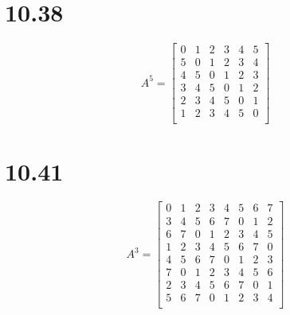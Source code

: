 \documentclass{article}
\begin{document}
\section*{10.38}
$$A^5 = \begin{bmatrix}
0 & 1 & 2 & 3 & 4 & 5 \\
5 & 0 & 1 & 2 & 3 & 4 \\
4 & 5 & 0 & 1 & 2 & 3 \\
3 & 4 & 5 & 0 & 1 & 2 \\
2 & 3 & 4 & 5 & 0 & 1 \\
1 & 2 & 3 & 4 & 5 & 0 \\
\end{bmatrix}$$

\section*{10.41}
$$A^3 = \begin{bmatrix}
0 & 1 & 2 & 3 & 4 & 5 & 6 & 7 \\
3 & 4 & 5 & 6 & 7 & 0 & 1 & 2 \\
6 & 7 & 0 & 1 & 2 & 3 & 4 & 5 \\
1 & 2 & 3 & 4 & 5 & 6 & 7 & 0 \\
4 & 5 & 6 & 7 & 0 & 1 & 2 & 3 \\
7 & 0 & 1 & 2 & 3 & 4 & 5 & 6 \\
2 & 3 & 4 & 5 & 6 & 7 & 0 & 1 \\
5 & 6 & 7 & 0 & 1 & 2 & 3 & 4 \\
\end{bmatrix}$$
\end{document}
